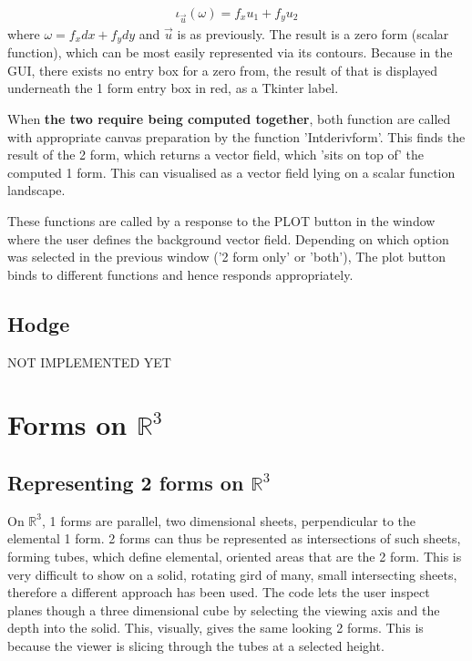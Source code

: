 \documentclass[11]{report}
\begin{document}
\begin{equation}
	\label{T2} \begin{split}
		\iota_{\vec{u}}(\omega) = f_{x} u_{1} + f_{y} u_{2}
	\end{split}
\end{equation}
where $\omega = f_{x} dx + f_{y} dy$ and $\vec{u}$ is as previously. The result is a zero form (scalar function), which can be most easily represented via its contours. Because in the GUI, there exists no entry box for a zero from, the result of that is displayed underneath the 1 form entry box in red, as a Tkinter label.

When \textbf{the two require being computed together}, both function are called with appropriate canvas preparation by the function 'Int\textunderscore deriv\textunderscore form'. This finds the result of the 2 form, which returns a vector field, which 'sits on top of' the computed 1 form. This can visualised as a vector field lying on a scalar function landscape.

\noindent These functions are called by a response to the PLOT button in the window where the user defines the background vector field. Depending on which option was selected in the previous window ('2 form only' or 'both'), The plot button binds to different functions and hence responds appropriately.

\subsection{Hodge}


NOT IMPLEMENTED YET



\section{Forms on $\mathbb{R}^{3}$}
\subsection{Representing 2 forms on $\mathbb{R}^{3}$}
On $\mathbb{R}^{3}$, 1 forms are parallel, two dimensional sheets, perpendicular to the elemental 1 form. 2 forms can thus be represented as intersections of such sheets, forming tubes, which define elemental, oriented areas that are the 2 form. This is very difficult to show on a solid, rotating gird of many, small intersecting sheets, therefore a different approach has been used. The code lets the user inspect planes though a three dimensional cube by selecting the viewing axis and the depth into the solid.
This, visually, gives the same looking 2 forms. This is because the viewer is slicing through the tubes at a selected height.
\end{document}
